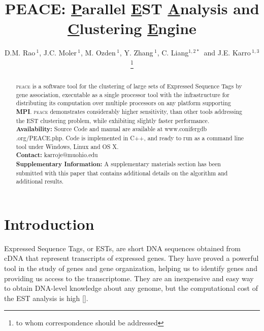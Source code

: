 \documentclass{bioinfo}
\begin{document}

\title[PEACE cluster]{PEACE: {\underline P}arallel {\underline E}ST {\underline A}nalysis
  and {\underline C}lustering {\underline E}ngine}
\author{D.M. Rao\,$^{1}$, J.C. Moler\,$^{1}$, M. Ozden\,$^1$, Y. Zhang\,$^{1}$,
  C. Liang$^{1,2*}$\, and J.E. Karro\,$^{1,3}$\footnote{to whom
    correspondence should be addressed}}
\address{$^1$ Department of Computer Science and Software Engineering, \\
  $^2$ Department of Botany, \\
  $^3$ and Department of Microbiology, Miami University, Oxford, Ohio,
  USA}



\maketitle

\begin{abstract} 
   \textsc{peace} is a software tool for the
  clustering of large sets of Expressed Sequence Tags by gene
  association, executable as a single processor tool with the
  infrastructure for distributing its computation over multiple
  processors on any platform supporting {\bf MPI}.  \textsc{peace}
  demonstrates considerably higher sensitivity, than other tools
  addressing the EST clustering problem, while exhibiting slightly
  faster performance.\\
  {\bf Availability: } Source Code and manual are available at
  www.conifergdb\\.org/PEACE.php.  Code is implemented in C++, and ready
  to run as a command line tool under Windows, Linux and OS X. \\
  {\bf Contact: } karroje@muohio.edu \\
  {\bf Supplementary Information:} A supplementary materials section
  has been submitted with this paper that contains additional details on the
  algorithm and additional results.
\end{abstract}


\section {Introduction}

Expressed Sequence Tags, or ESTs, are short DNA sequences obtained
from cDNA that represent transcripts of expressed genes.  They have
proved a powerful tool in the study of genes and gene organization, helping us to
identify genes and providing us access to the
transcriptome.  They are an inexpensive and easy way to obtain DNA-level
knowledge about any genome, but the computational cost of the EST analysis
is high [\cite{Nagaraj07}].
\end{document}
